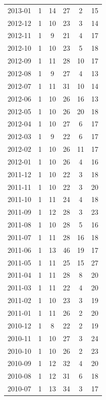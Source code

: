 \documentclass[12pt]{report}
\begin{document}
\begin{longtable}{|c|c|c|c|c|c|}
            2013-01 & 1 & 14 & 27 & 2 & 15 \\
            2012-12 & 1 & 10 & 23 & 3 & 14 \\
            2012-11 & 1 & 9 & 21 & 4 & 17 \\
            2012-10 & 1 & 10 & 23 & 5 & 18 \\
            2012-09 & 1 & 11 & 28 & 10 & 17 \\
            2012-08 & 1 & 9 & 27 & 4 & 13 \\
            2012-07 & 1 & 11 & 31 & 10 & 14 \\
            2012-06 & 1 & 10 & 26 & 16 & 13 \\
            2012-05 & 1 & 10 & 26 & 20 & 18 \\
            2012-04 & 1 & 10 & 27 & 6 & 17 \\
            2012-03 & 1 & 9 & 22 & 6 & 17 \\
            2012-02 & 1 & 10 & 26 & 11 & 17 \\
            2012-01 & 1 & 10 & 26 & 4 & 16 \\
            2011-12 & 1 & 10 & 22 & 3 & 18 \\
            2011-11 & 1 & 10 & 22 & 3 & 20 \\
            2011-10 & 1 & 11 & 24 & 4 & 18 \\
            2011-09 & 1 & 12 & 28 & 3 & 23 \\
            2011-08 & 1 & 10 & 28 & 5 & 16 \\
            2011-07 & 1 & 11 & 28 & 16 & 18 \\
            2011-06 & 1 & 13 & 46 & 19 & 17 \\
            2011-05 & 1 & 11 & 25 & 15 & 27 \\
            2011-04 & 1 & 11 & 28 & 8 & 20 \\
            2011-03 & 1 & 11 & 22 & 4 & 20 \\
            2011-02 & 1 & 10 & 23 & 3 & 19 \\
            2011-01 & 1 & 11 & 26 & 2 & 20 \\
            2010-12 & 1 & 8 & 22 & 2 & 19 \\
            2010-11 & 1 & 10 & 27 & 3 & 24 \\
            2010-10 & 1 & 10 & 26 & 2 & 23 \\
            2010-09 & 1 & 12 & 32 & 4 & 20 \\
            2010-08 & 1 & 12 & 31 & 6 & 18 \\
            2010-07 & 1 & 13 & 34 & 3 & 17 \\

\end{longtable}
\end{document}
